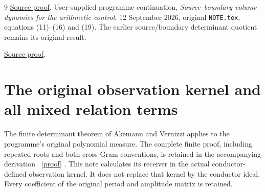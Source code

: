 \documentclass[11pt]{article}
\begin{document}
\begin{thebibliography}{9}
\href{https://github.com/KokunoYumeto/zeta-function-research-reader/blob/5992ad50c0f2a06921f1fcaded7b4e38097c0739/workbenches/splitzero-tandem/continuations/20260920-original-kernel-mixed-determinants/MIXED_CONFLUENT_PROOF.tex\#L1}{Source proof}.
 User-supplied programme continuation,
\emph{Source--boundary volume dynamics for the arithmetic control},
12 September 2026, original \texttt{NOTE.tex}, equations (11)--(16)
and (19). The earlier source/boundary determinant quotient remains
its original result.

\href{https://github.com/KokunoYumeto/zeta-function-research-reader/blob/5992ad50c0f2a06921f1fcaded7b4e38097c0739/workbenches/splitzero-tandem/continuations/20260920-original-kernel-mixed-determinants/providers/TODA_VOLUME_CONTROL.tex\#L1}{Source proof}.
\end{thebibliography}

\endgroup



\clearpage\begingroup
\part*{The original observation kernel and all mixed relation terms}
\newcommand{\mrrootC}{\mathbb C}
\newcommand{\mrrootR}{\mathbb R}


The finite determinant theorem of Akemann and Vernizzi
\cite[\texttt{Th}, \texttt{Ddef}, \texttt{deg}]{mrroot:AV} applies to the
programme's original polynomial measure. The complete finite proof,
including repeated roots and both cross-Gram conventions, is retained
in the accompanying derivation \cite{mrroot:Mixed}%
~\href{https://github.com/KokunoYumeto/zeta-function-research-reader/blob/5992ad50c0f2a06921f1fcaded7b4e38097c0739/workbenches/splitzero-tandem/continuations/20260920-original-kernel-mixed-determinants/MIXED_CONFLUENT_PROOF.tex\#L1}{[proof]}%
{}. This note calculates its
receiver in the actual conductor-defined observation kernel. It does
not replace that kernel by the conductor ideal. Every coefficient of
the original period and amplitude matrix is retained.
\end{document}
